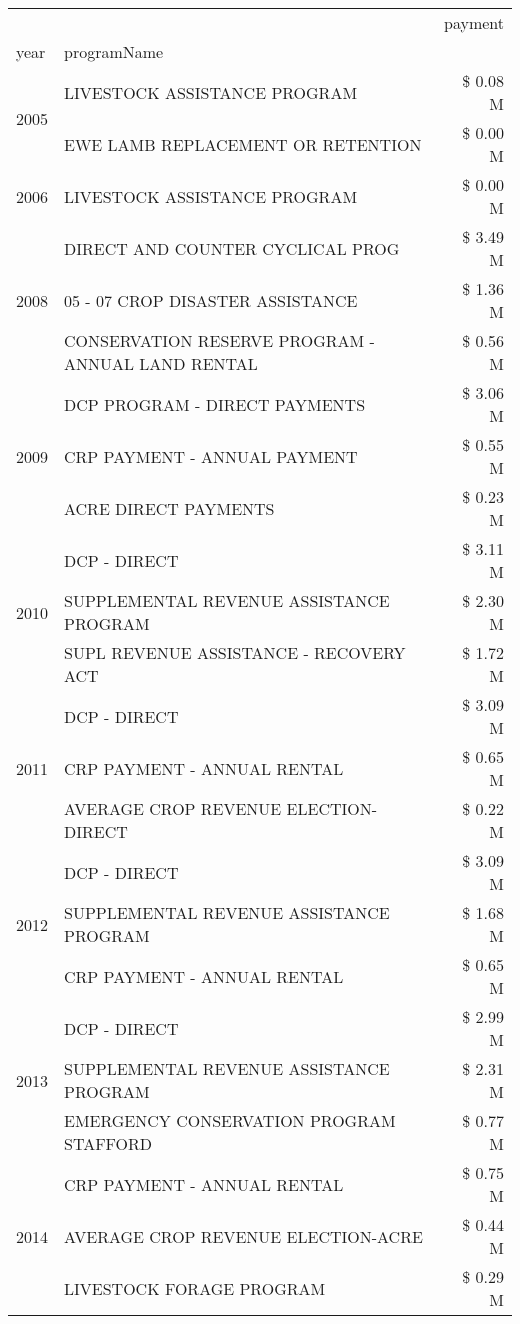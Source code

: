 \begin{tabular}{llr}
\toprule
 &  & payment \\
year & programName &  \\
\midrule
\multirow[t]{2}{*}{2005} & LIVESTOCK ASSISTANCE PROGRAM & \$ 0.08 M \\
 & EWE LAMB REPLACEMENT OR RETENTION & \$ 0.00 M \\
\cline{1-3}
2006 & LIVESTOCK ASSISTANCE PROGRAM & \$ 0.00 M \\
\cline{1-3}
\multirow[t]{3}{*}{2008} & DIRECT AND COUNTER CYCLICAL PROG & \$ 3.49 M \\
 & 05 - 07 CROP DISASTER ASSISTANCE & \$ 1.36 M \\
 & CONSERVATION RESERVE PROGRAM - ANNUAL LAND RENTAL & \$ 0.56 M \\
\cline{1-3}
\multirow[t]{3}{*}{2009} & DCP PROGRAM - DIRECT PAYMENTS & \$ 3.06 M \\
 & CRP PAYMENT - ANNUAL PAYMENT & \$ 0.55 M \\
 & ACRE DIRECT PAYMENTS & \$ 0.23 M \\
\cline{1-3}
\multirow[t]{3}{*}{2010} & DCP - DIRECT & \$ 3.11 M \\
 & SUPPLEMENTAL REVENUE ASSISTANCE PROGRAM & \$ 2.30 M \\
 & SUPL REVENUE ASSISTANCE - RECOVERY ACT & \$ 1.72 M \\
\cline{1-3}
\multirow[t]{3}{*}{2011} & DCP - DIRECT & \$ 3.09 M \\
 & CRP PAYMENT - ANNUAL RENTAL & \$ 0.65 M \\
 & AVERAGE CROP REVENUE ELECTION-DIRECT & \$ 0.22 M \\
\cline{1-3}
\multirow[t]{3}{*}{2012} & DCP - DIRECT & \$ 3.09 M \\
 & SUPPLEMENTAL REVENUE ASSISTANCE PROGRAM & \$ 1.68 M \\
 & CRP PAYMENT - ANNUAL RENTAL & \$ 0.65 M \\
\cline{1-3}
\multirow[t]{3}{*}{2013} & DCP - DIRECT & \$ 2.99 M \\
 & SUPPLEMENTAL REVENUE ASSISTANCE PROGRAM & \$ 2.31 M \\
 & EMERGENCY CONSERVATION PROGRAM STAFFORD & \$ 0.77 M \\
\cline{1-3}
\multirow[t]{3}{*}{2014} & CRP PAYMENT - ANNUAL RENTAL & \$ 0.75 M \\
 & AVERAGE CROP REVENUE ELECTION-ACRE & \$ 0.44 M \\
 & LIVESTOCK FORAGE PROGRAM & \$ 0.29 M \\

\end{tabular}
